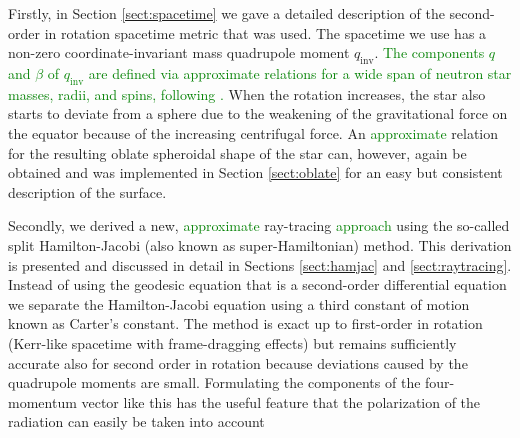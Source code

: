 \documentclass{aa}
\newcommand{\refe}[1]{\textcolor{green}{{#1}}}
\newcommand{\qinv}{\ensuremath{q_{\mathrm{inv}}}}
\begin{document}
Firstly, in Section \ref{sect:spacetime} we gave a detailed description of the second-order in rotation spacetime metric that was used.
The spacetime we use has a non-zero coordinate-invariant mass quadrupole moment $\qinv$. 
\refe{The components $q$ and $\beta$ of $\qinv$ are defined via approximate relations for a wide span of neutron star masses, radii, and spins, following \citet{aGM14}.}
When the rotation increases, the star also starts to deviate from a sphere due to the weakening of the gravitational force on the equator because of the increasing centrifugal force.
An \refe{approximate} relation for the resulting oblate spheroidal shape of the star can, however, again be obtained \citep{MLC07, aGM14} and was implemented in Section \ref{sect:oblate} for an easy but consistent description of the surface.

Secondly, we derived a new, \refe{approximate} ray-tracing \refe{approach} using the so-called split Hamilton-Jacobi (also known as super-Hamiltonian) method.
This derivation is presented and discussed in detail in Sections \ref{sect:hamjac} and \ref{sect:raytracing}.
Instead of using the geodesic equation that is a second-order differential equation we separate the Hamilton-Jacobi equation using a third constant of motion known as Carter's constant.
The method is exact up to first-order in rotation (Kerr-like spacetime with frame-dragging effects) but remains sufficiently accurate also for second order in rotation because deviations caused by the quadrupole moments are small.
Formulating the components of the four-momentum vector like this has the useful feature that the polarization of the radiation can easily be taken into account \citep[see e.g.][]{cha, dexter2016}
\end{document}

